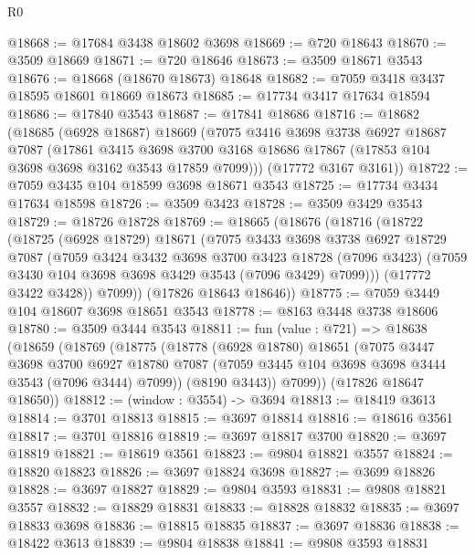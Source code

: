 \begin{lexlean}{R0}
\begin{coremodule}
@18668 := @17684 @3438 @18602 @3698
@18669 := @720 @18643
@18670 := @3509 @18669
@18671 := @720 @18646
@18673 := @3509 @18671 @3543
@18676 := @18668 (@18670 @18673) @18648
@18682 := @7059 @3418 @3437 @18595 @18601 @18669 @18673
@18685 := @17734 @3417 @17634 @18594
@18686 := @17840 @3543
@18687 := @17841 @18686
@18716 := @18682
    (@18685
      (@6928 @18687)
      @18669
      (@7075
        @3416
        @3698
        @3738
        @6927
        @18687
        @7087
        (@17861
          @3415
          @3698
          @3700
          @3168
          @18686
          @17867
          (@17853 @104 @3698 @3698 @3162 @3543 @17859 @7099)))
      (@17772 @3167 @3161))
@18722 := @7059 @3435 @104 @18599 @3698 @18671 @3543
@18725 := @17734 @3434 @17634 @18598
@18726 := @3509 @3423
@18728 := @3509 @3429 @3543
@18729 := @18726 @18728
@18769 := @18665
    (@18676
      (@18716
        (@18722
          (@18725
            (@6928 @18729)
            @18671
            (@7075
              @3433
              @3698
              @3738
              @6927
              @18729
              @7087
              (@7059
                @3424
                @3432
                @3698
                @3700
                @3423
                @18728
                (@7096 @3423)
                (@7059 @3430 @104 @3698 @3698 @3429 @3543 (@7096 @3429) @7099)))
            (@17772 @3422 @3428))
          @7099))
      (@17826 @18643 @18646))
@18775 := @7059 @3449 @104 @18607 @3698 @18651 @3543
@18778 := @8163 @3448 @3738 @18606
@18780 := @3509 @3444 @3543
@18811 := fun (value : @721) =>
  @18638
    (@18659
      (@18769
        (@18775
          (@18778
            (@6928 @18780)
            @18651
            (@7075
              @3447
              @3698
              @3700
              @6927
              @18780
              @7087
              (@7059 @3445 @104 @3698 @3698 @3444 @3543 (@7096 @3444) @7099))
            (@8190 @3443))
          @7099))
      (@17826 @18647 @18650))
@18812 := (window : @3554) -> @3694
@18813 := @18419 @3613
@18814 := @3701 @18813
@18815 := @3697 @18814
@18816 := @18616 @3561
@18817 := @3701 @18816
@18819 := @3697 @18817 @3700
@18820 := @3697 @18819
@18821 := @18619 @3561
@18823 := @9804 @18821 @3557
@18824 := @18820 @18823
@18826 := @3697 @18824 @3698
@18827 := @3699 @18826
@18828 := @3697 @18827
@18829 := @9804 @3593
@18831 := @9808 @18821 @3557
@18832 := @18829 @18831
@18833 := @18828 @18832
@18835 := @3697 @18833 @3698
@18836 := @18815 @18835
@18837 := @3697 @18836
@18838 := @18422 @3613
@18839 := @9804 @18838
@18841 := @9808 @3593 @18831

\end{coremodule}
\end{lexlean}
